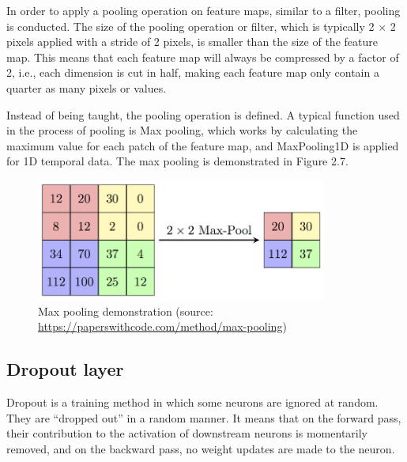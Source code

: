 In order to apply a pooling operation on feature maps, similar to a filter, pooling is conducted. The size of the pooling operation or filter, which is typically 2 $\times$ 2 pixels applied with a stride of 2 pixels, is smaller than the size of the feature map. This means that each feature map will always be compressed by a factor of 2, i.e., each dimension is cut in half, making each feature map only contain a quarter as many pixels or values.

Instead of being taught, the pooling operation is defined. A typical function used in the process of pooling is Max pooling, which works by calculating the maximum value for each patch of the feature map, and MaxPooling1D is applied for 1D temporal data. The max pooling is demonstrated in Figure 2.7.

\begin{figure}[ht]
	\centering
	\includegraphics[width=\linewidth, height=4cm,keepaspectratio]{figures/maxpooling.png}
   \caption{Max pooling demonstration (source: \url{https://paperswithcode.com/method/max-pooling})}
\end{figure}

\subsection{Dropout layer}
\hspace{0.5cm}Dropout is a training method in which some neurons are ignored at random. They are ``dropped out'' in a random manner. It means that on the forward pass, their contribution to the activation of downstream neurons is momentarily removed, and on the backward pass, no weight updates are made to the neuron.

